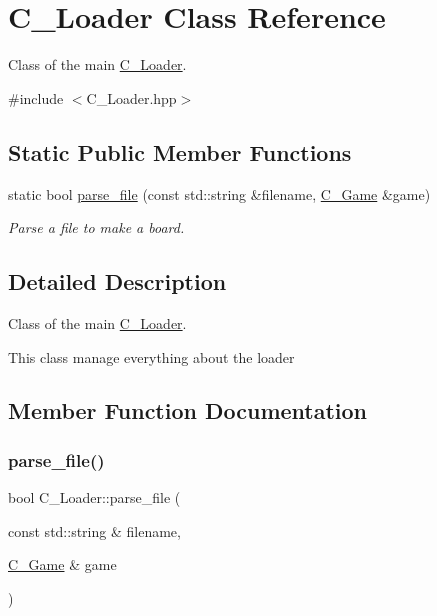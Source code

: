 \hypertarget{classLoader}{}\section{C_Loader Class Reference}
\label{classLoader}


Class of the main \hyperlink{classLoader}{C_Loader}.




{\ttfamily \#include $<$C_Loader.\+hpp$>$}

\subsection*{Static Public Member Functions}
\begin{DoxyCompactItemize}
\item 
static bool \hyperlink{classLoader_a22ccbf4c21a330d16e37b99948d43ddb}{parse\+\_\+file} (const std\+::string \&filename, \hyperlink{classGame}{C_Game} \&game)
\begin{DoxyCompactList}\small\item\em Parse a file to make a board. \end{DoxyCompactList}\end{DoxyCompactItemize}


\subsection{Detailed Description}
Class of the main \hyperlink{classLoader}{C_Loader}.

This class manage everything about the loader 

\subsection{Member Function Documentation}
\mbox{\label{classLoader_a22ccbf4c21a330d16e37b99948d43ddb}} 
\subsubsection{\texorpdfstring{parse\+\_\+file()}{parse\_file()}}
{\footnotesize\ttfamily bool C_Loader\+::parse\+\_\+file (\begin{DoxyParamCaption}\item[{const std\+::string \&}]{filename,  }\item[{\hyperlink{classGame}{C_Game} \&}]{game }\end{DoxyParamCaption})\hspace{0.3cm}{\ttfamily [static]}}



